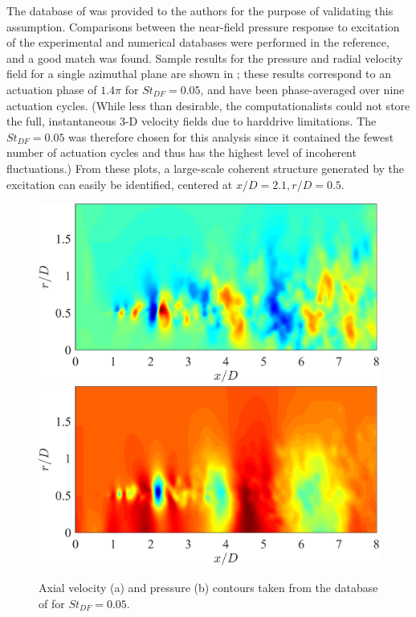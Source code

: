 The database of \citet{Speth2014} was provided to the authors for the purpose of validating this assumption.
Comparisons between the near-field pressure response to excitation of the experimental and numerical databases were performed in the reference, and a good match was found.
Sample results for the pressure and radial velocity field for a single azimuthal plane are shown in ; these results correspond to an actuation phase of $1.4 \pi$ for $St_{DF} = 0.05$, and have been phase-averaged over nine actuation cycles.
(While less than desirable, the computationalists could not store the full, instantaneous 3-D velocity fields due to harddrive limitations. The $St_{DF} = 0.05$ was therefore chosen for this analysis since it contained the fewest number of actuation cycles and thus has the highest level of incoherent fluctuations.)
From these plots, a large-scale coherent structure generated by the excitation can easily be identified, centered at $x/D = 2.1, r/D = 0.5$.
\begin{figure}
	\centering
		\includegraphics[width=0.6\linewidth]{Figures/LES_phavg_streamwise_Ur.png}
		\includegraphics[width=0.6\linewidth]{Figures/LES_phavg_streamwise_p.png}
	\caption{Axial velocity (a) and pressure (b) contours taken from the database of \citet{Speth2014} for $St_{DF} = 0.05$.}
	\label{fig:LES_streamwise_phavg}
\end{figure}


